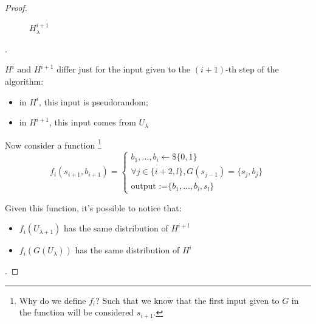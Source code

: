 \begin{proof}
\begin{figure}[h!]
        \caption{$H_{\lambda}^{i+1}$}
    \end{figure}.

    $H^{i}$ and $H^{i+1}$ differ just for the input given to the $(i+1)$-th step of the algorithm:
    \begin{itemize}
        \item in $H^{i}$, this input is pseudorandom;
        \item in $H^{i+1}$, this input comes from $U_{\lambda}$
    \end{itemize}

    Now consider a function \footnote{\small{Why do we define $f_{i}$? Such that we know that
    the first input given to $G$ in the function will be considered $s_{i+1}$.}}
    \[
        f_{i}(s_{i+1},b_{i+1})=
            \begin{cases}
                {b_{1}, ..., b_{i} \leftarrow \$ \{0,1\}} \\
                \forall j \in \{i+2, l\}, G(s_{j-1})=\{s_{j}, b_{j}\} \\
                \text{output :=} \{b_{1}, ..., b_{l}, s_{l}\}
            \end{cases}
    \]

    Given this function, it's possible to notice that:
    \begin{itemize}
        \item $f_{i}(U_{\lambda + 1})$ has the same distribution of $H^{i+l}$
        \item $f_{i}(G(U_{\lambda}))$ has the same distribution of $H^{i}$
    \end{itemize}.


\end{proof}
